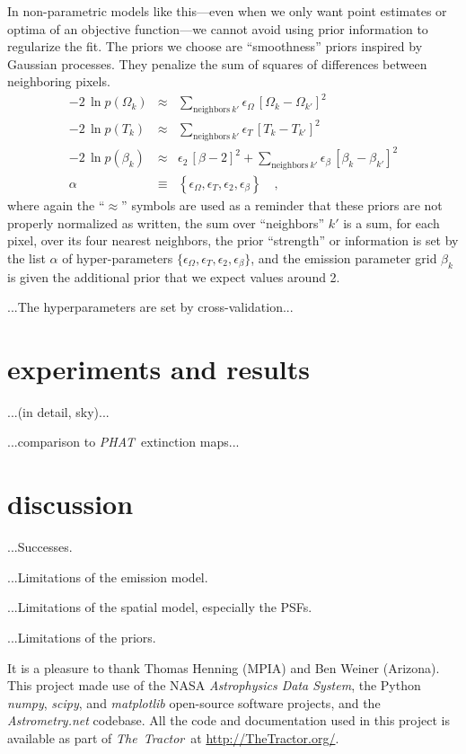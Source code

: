 \documentclass[12pt,pdftex,preprint]{aastex}
\newcommand{\project}[1]{\textsl{#1}}
\newcommand{\TheTractor}{\project{The~Tractor}}
\newcommand{\PHAT}{\project{PHAT}}
\begin{document}
In non-parametric models like this---even when we only want point
estimates or optima of an objective function---we cannot avoid using
prior information to regularize the fit.  The priors we choose are
``smoothness'' priors inspired by Gaussian processes.  They penalize
the sum of squares of differences between neighboring pixels.
\begin{eqnarray}\displaystyle
-2\,\ln p(\Omega_k) &\approx& \sum_{\mathrm{neighbors}~k'} \epsilon_\Omega\,\left[\Omega_k - \Omega_{k'}\right]^2
\\
-2\,\ln p(T_k) &\approx& \sum_{\mathrm{neighbors}~k'} \epsilon_T\,\left[T_k - T_{k'}\right]^2
\\
-2\,\ln p(\beta_k) &\approx& \epsilon_2\,\left[\beta - 2\right]^2
                    + \sum_{\mathrm{neighbors}~k'} \epsilon_\beta\,\left[\beta_k - \beta_{k'}\right]^2
\\
\alpha &\equiv& \left\{\epsilon_\Omega, \epsilon_T, \epsilon_2, \epsilon_\beta\right\}
\quad ,
\end{eqnarray}
where again the ``$\approx$'' symbols are used as a reminder that
these priors are not properly normalized as written, the sum over
``neighbors'' $k'$ is a sum, for each pixel, over its four nearest
neighbors, the prior ``strength'' or information is set by the list
$\alpha$ of hyper-parameters $\{\epsilon_\Omega, \epsilon_T,
\epsilon_2, \epsilon_\beta\}$, and the emission parameter grid
$\beta_k$ is given the additional prior that we expect values around
2.

...The hyperparameters are set by cross-validation...

\section{experiments and results}

...(in detail, sky)...

...comparison to \PHAT\ extinction maps...

\section{discussion}

...Successes.

...Limitations of the emission model.

...Limitations of the spatial model, especially the PSFs.

...Limitations of the priors.

\acknowledgements It is a pleasure to thank Thomas Henning (MPIA) and
Ben Weiner (Arizona).  This project made use of the NASA
\project{Astrophysics Data System}, the Python \project{numpy},
\project{scipy}, and \project{matplotlib} open-source software
projects, and the \project{Astrometry.net} codebase.  All the code and
documentation used in this project is available as part of
\TheTractor\ at \url{http://TheTractor.org/}.
\end{document}
